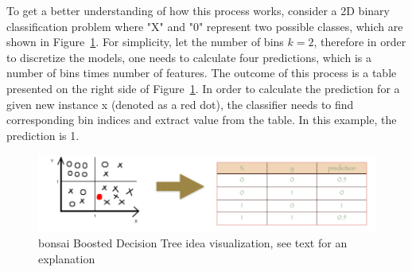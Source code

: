To get a better understanding of how this process works, consider a 2D binary classification problem where "X" and "0" represent two possible classes, which are shown in Figure~\ref{fig:bbdt_theory}. For simplicity, let the number of bins $k=2$, therefore in order to discretize the models, one needs to calculate four predictions, which is a number of bins times number of features. The outcome of this process is a table presented on the right side of Figure~\ref{fig:bbdt_theory}. In order to calculate the prediction for a given new instance x (denoted as a red dot), the classifier needs to find corresponding bin indices and extract value from the table. In this example, the prediction is 1. 



\begin{figure}[!h]
\centering
\includegraphics{figures/BBDT_explanation.png}
\caption{bonsai Boosted Decision Tree idea visualization, see text for an explanation
\label{fig:bbdt_theory}}
\end{figure} 